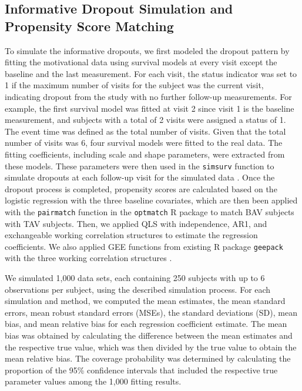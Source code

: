 \documentclass[
]{aft}
\begin{document}
\subsection{Informative Dropout Simulation and Propensity Score
Matching}\label{informative-dropout-simulation-and-propensity-score-matching}

To simulate the informative dropouts, we first modeled the dropout
pattern by fitting the motivational data using survival models at every
visit except the baseline and the last measurement. For each visit, the
status indicator was set to 1 if the maximum number of visits for the
subject was the current visit, indicating dropout from the study with no
further follow-up measurements. For example, the first survival model
was fitted at visit 2 since visit 1 is the baseline measurement, and
subjects with a total of 2 visits were assigned a status of 1. The event
time was defined as the total number of visits. Given that the total
number of visits was 6, four survival models were fitted to the real
data. The fitting coefficients, including scale and shape parameters,
were extracted from these models. These parameters were then used in the
\texttt{simsurv} function to simulate dropouts at each follow-up visit
for the simulated data \citep{simsurv20}. Once the dropout process is
completed, propensity scores are calculated based on the logistic
regression with the three baseline covariates, which are then been
applied with the \texttt{pairmatch} function in the \texttt{optmatch} R
package to match BAV subjects with TAV subjects. Then, we applied QLS
with independence, AR1, and exchangeable working correlation structures
to estimate the regression coefficients. We also applied GEE functions
from existing R package \texttt{geepack} with the three working
correlation structures \citep{Hojsgaard2006}.

We simulated 1,000 data sets, each containing 250 subjects with up to 6
observations per subject, using the described simulation process. For
each simulation and method, we computed the mean estimates, the mean
standard errors, mean robust standard errors (MSEs), the standard
deviations (SD), mean bias, and mean relative bias for each regression
coefficient estimate. The mean bias was obtained by calculating the
difference between the mean estimates and the respective true value,
which was then divided by the true value to obtain the mean relative
bias. The coverage probability was determined by calculating the
proportion of the 95\% confidence intervals that included the respective
true parameter values among the 1,000 fitting results.
\end{document}
